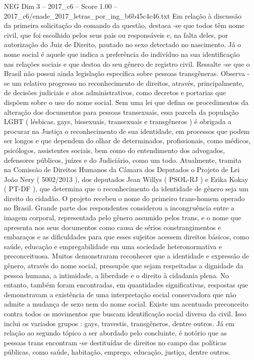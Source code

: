 \begin{textsample}{NEG Dim 3 – 2017\_c6 – Score 1.00 – 2017\_c6/enade\_2017\_letras\_por\_ing\_b6b45c4c46.txt}
Em relação à discussão da primeira solicitação do comando da questão, destaca -se que todos têm nome civil, que foi escolhido pelos seus pais ou responsáveis e, na falta deles, por autorização do Juiz de Direito, pautado no sexo detectado no nascimento.
Já o nome social é aquele que indica a preferência do indivíduo na sua identificação nas relações sociais e que destoa do seu gênero de registro civil.
Ressalte -se que o Brasil não possui ainda legislação específica sobre pessoas transgêneras.
Observa -se um relativo progresso no reconhecimento de direitos, através, principalmente, de decisões judiciais e atos administrativos, como decretos e portarias que dispõem sobre o uso do nome social.
Sem uma lei que defina os procedimentos da alteração dos documentos para pessoas transexuais, essa parcela da população LGBT ( lésbicas, gays, bissexuais, transexuais e transgêneros ) é obrigada a procurar na Justiça o reconhecimento de sua identidade, em processos que podem ser longos e que dependem do olhar de determinados, profissionais, como médicos, psicólogos, assistentes sociais, bem como do entendimento dos advogados, defensores públicos, juízes e do Judiciário, como um todo.
Atualmente, tramita na Comissão de Direitos Humanos da Câmara dos Deputados o Projeto de Lei João Nery ( 5002/2013 ), dos deputados Jean Willys ( PSOL-RJ ) e Erika Kokay ( PT-DF ), que determina que o reconhecimento da identidade de gênero seja um direito do cidadão.
O projeto recebeu o nome do primeiro trans-homem operado no Brasil.
Grande parte dos respondentes considerou a incongruência entre a imagem corporal, representada pelo gênero assumido pelos trans, e o nome que apresenta nos seus documentos como causa de sérios constrangimentos e embaraços e as dificuldades para que esses sujeitos acessem direitos básicos, como saúde, educação e empregabilidade em uma sociedade heteronormativa e preconceituosa.
Muitos demonstraram reconhecer que a identidade e expressão de gênero, através do nome social, pressupõe que sejam respeitadas a dignidade da pessoa humana, a intimidade, a liberdade e o direito à cidadania plena.
No entanto, também foram encontradas, em quantidades significativas, respostas que demonstravam a existência de uma interpretação social conservadora que não admite a mudança de sexo nem do nome social.
Existe um acentuado preconceito contra todos os movimentos que buscam identificação social diversa da civil.
Isso inclui os variados grupos : gays, travestis, transgêneros, dentre outros.
Já em relação ao segundo tópico a ser abordado pelo concluinte, é notório que as pessoas trans encontram -se destituídas de direitos no campo das políticas públicas, como saúde, habitação, emprego, educação, justiça, dentre outros.

\end{textsample}
